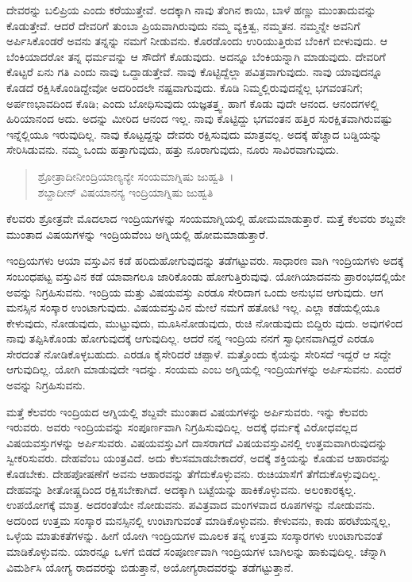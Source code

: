 ದೇವರನ್ನು ಬಲಿಪ್ರಿಯ ಎಂದು ಕರೆಯುತ್ತೇವೆ. ಅದಕ್ಕಾಗಿ ನಾವು ತೆಂಗಿನ ಕಾಯಿ, ಬಾಳೆ ಹಣ್ಣು ಮುಂತಾದುವನ್ನು ಕೊಡುತ್ತೇವೆ. ಆದರೆ ದೇವರಿಗೆ ತುಂಬಾ ಪ್ರಿಯವಾಗಿರುವುದು ನಮ್ಮ ವ್ಯಕ್ತಿತ್ವ, ನಮ್ಮತನ. ನಮ್ಮನ್ನೇ ಅವನಿಗೆ ಅರ್ಪಿಸಿಕೊಂಡರೆ ಅವನು ತನ್ನನ್ನು ನಮಗೆ ನೀಡುವನು. ಕೊರಡೊಂದು ಉರಿಯುತ್ತಿರುವ ಬೆಂಕಿಗೆ ಬೀಳುವುದು. ಆ ಬೆಂಕಿಯಾದರೋ ತನ್ನ ಧರ್ಮವನ್ನು ಆ ಸೌದೆಗೆ ಕೊಡುವುದು. ಅದನ್ನೂ ಬೆಂಕಿಯನ್ನಾಗಿ ಮಾಡುವುದು. ದೇವರಿಗೆ ಕೊಟ್ಟರೆ ಏನು ಗತಿ ಎಂದು ನಾವು ಒದ್ದಾಡುತ್ತೇವೆ. ನಾವು ಕೊಟ್ಟಿದ್ದೆಲ್ಲಾ ಪವಿತ್ರವಾಗುವುದು. ನಾವು ಯಾವುದನ್ನೂ ಕೊಡದೆ ರಕ್ಷಿಸಿಕೊಂಡಿದ್ದೇವೋ ಅದರಿಂದಲೇ ನಷ್ಟವಾಗುವುದು. ಕೊಡಿ ನಿಮ್ಮಲ್ಲಿರುವುದನ್ನೆಲ್ಲ ಭಗವಂತನಿಗೆ; ಅರ್ಪಣಭಾವದಿಂದ ಕೊಡಿ; ಎಂದು ಬೋಧಿಸುವುದು ಯಜ್ಞತತ್ತ್ವ. ಹಾಗೆ ಕೊಡು ವುದೇ ಆನಂದ. ಆನಂದಗಳಲ್ಲಿ ಹಿರಿಯಾನಂದ ಅದು. ಅದನ್ನು ಮೀರಿದ ಆನಂದ ಇಲ್ಲ. ನಾವು ಕೊಟ್ಟಿದ್ದು ಭಗವಂತನ ಹತ್ತಿರ ಸುರಕ್ಷಿತವಾಗಿರುವಷ್ಟು ಇನ್ನೆಲ್ಲಿಯೂ ಇರುವುದಿಲ್ಲ. ನಾವು ಕೊಟ್ಟದ್ದನ್ನು ದೇವರು ರಕ್ಷಿಸುವುದು ಮಾತ್ರವಲ್ಲ. ಅದಕ್ಕೆ ಹೆಚ್ಚಾದ ಬಡ್ಡಿಯನ್ನು ಸೇರಿಸಿಡುವನು. ನಮ್ಮ ಒಂದು ಹತ್ತಾಗುವುದು, ಹತ್ತು ನೂರಾಗುವುದು, ನೂರು ಸಾವಿರವಾಗುವುದು.

\begin{verse}
ಶ್ರೋತ್ರಾದೀನೀಂದ್ರಿಯಾಣ್ಯನ್ಯೇ ಸಂಯಮಾಗ್ನಿಷು ಜುಹ್ವತಿ~।\\ಶಬ್ದಾದೀನ್ ವಿಷಯಾನನ್ಯ ಇಂದ್ರಿಯಾಗ್ನಿಷು ಜುಹ್ವತಿ 
\end{verse}

{\small ಕೆಲವರು ಶ್ರೋತ್ರವೇ ಮೊದಲಾದ ಇಂದ್ರಿಯಗಳನ್ನು ಸಂಯಮಾಗ್ನಿಯಲ್ಲಿ ಹೋಮಮಾಡುತ್ತಾರೆ. ಮತ್ತೆ ಕೆಲವರು ಶಬ್ದವೇ ಮುಂತಾದ ವಿಷಯಗಳನ್ನು ಇಂದ್ರಿಯವೆಂಬ ಅಗ್ನಿಯಲ್ಲಿ ಹೋಮಮಾಡುತ್ತಾರೆ.}

ಇಂದ್ರಿಯಗಳು ಆಯಾ ವಸ್ತುವಿನ ಕಡೆ ಹರಿದುಹೋಗುವುದನ್ನು ತಡೆಗಟ್ಟುವರು. ಸಾಧಾರಣ ವಾಗಿ ಇಂದ್ರಿಯಗಳು ಅದಕ್ಕೆ ಸಂಬಂಧಪಟ್ಟ ವಸ್ತುವಿನ ಕಡೆ ಯಾವಾಗಲೂ ಜಾರಿಕೊಂಡು ಹೋಗುತ್ತಿರುವುವು. ಯೋಗಿಯಾದವನು ಪ್ರಾರಂಭದಲ್ಲಿಯೇ ಅವನ್ನು ನಿಗ್ರಹಿಸುವನು. ಇಂದ್ರಿಯ ಮತ್ತು ವಿಷಯವಸ್ತು ಎರಡೂ ಸೇರಿದಾಗ ಒಂದು ಅನುಭವ ಆಗುವುದು. ಆಗ ಮನಸ್ಸಿನ ಸಂಸ್ಕಾರ ಉಂಟಾಗುವುದು. ವಿಷಯವಸ್ತುವಿನ ಮೇಲೆ ನಮಗೆ ಹತೋಟಿ ಇಲ್ಲ. ಎಲ್ಲಾ ಕಡೆಯಲ್ಲಿಯೂ ಕೇಳುವುದು, ನೋಡುವುದು, ಮುಟ್ಟುವುದು, ಮೂಸಿನೋಡುವುದು, ರುಚಿ ನೋಡುವುದು ಬಿದ್ದಿರು ವುದು. ಅವುಗಳಿಂದ ನಾವು ತಪ್ಪಿಸಿಕೊಂಡು ಹೋಗುವುದಕ್ಕೆ ಆಗುವುದಿಲ್ಲ. ಆದರೆ ನನ್ನ ಇಂದ್ರಿಯ ನನಗೆ ಸ್ವಾಧೀನವಾಗಿದ್ದರೆ ಎರಡೂ ಸೇರದಂತೆ ನೋಡಿಕೊಳ್ಳಬಹುದು. ಎರಡೂ ಕೈಸೇರಿದರೆ ಚಪ್ಪಾಳೆ. ಮತ್ತೊಂದು ಕೈಯನ್ನು ಸೇರಿಸದೆ ಇದ್ದರೆ ಆ ಸದ್ದೇ ಆಗುವುದಿಲ್ಲ. ಯೋಗಿ ಮಾಡುವುದೇ ಇದನ್ನು. ಸಂಯಮ ಎಂಬ ಅಗ್ನಿಯಲ್ಲಿ ಇಂದ್ರಿಯಗಳನ್ನು ಅರ್ಪಿಸುವನು. ಎಂದರೆ ಅವನ್ನು ನಿಗ್ರಹಿಸುವನು.

ಮತ್ತೆ ಕೆಲವರು ಇಂದ್ರಿಯದ ಅಗ್ನಿಯಲ್ಲಿ ಶಬ್ದವೇ ಮುಂತಾದ ವಿಷಯಗಳನ್ನು ಅರ್ಪಿಸುವರು. ಇನ್ನು ಕೆಲವರು ಇರುವರು. ಅವರು ಇಂದ್ರಿಯವನ್ನು ಸಂಪೂರ್ಣವಾಗಿ ನಿಗ್ರಹಿಸುವುದಿಲ್ಲ. ಅದಕ್ಕೆ ಧರ್ಮಕ್ಕೆ ವಿರೋಧವಲ್ಲದ ವಿಷಯವಸ್ತುಗಳನ್ನು ಅರ್ಪಿಸುವರು. ವಿಷಯವಸ್ತುವಿಗೆ ದಾಸರಾಗದೆ ವಿಷಯವಸ್ತುವಿನಲ್ಲಿ ಉತ್ತಮವಾಗಿರುವುದನ್ನು ಸ್ವೀಕರಿಸುವರು. ದೇಹವೆಂಬ ಯಂತ್ರವಿದೆ. ಅದು ಕೆಲಸಮಾಡಬೇಕಾದರೆ, ಅದಕ್ಕೆ ಶಕ್ತಿಯನ್ನು ಕೊಡುವ ಆಹಾರವನ್ನು ಕೊಡಬೇಕು. ದೇಹಪೋಷಣೆಗೆ ಅವನು ಆಹಾರವನ್ನು ತೆಗೆದುಕೊಳ್ಳುವನು. ರುಚಿಯಾಸೆಗೆ ತೆಗೆದುಕೊಳ್ಳುವುದಿಲ್ಲ. ದೇಹವನ್ನು ಶೀತೋಷ್ಣದಿಂದ ರಕ್ಷಿಸಬೇಕಾಗಿದೆ. ಅದಕ್ಕಾಗಿ ಬಟ್ಟೆಯನ್ನು ಹಾಕಿಕೊಳ್ಳುವನು. ಅಲಂಕಾರಕ್ಕಲ್ಲ. ಉಪಯೋಗಕ್ಕೆ ಮಾತ್ರ. ಅದರಂತೆಯೇ ನೋಡುವನು. ಪವಿತ್ರವಾದ ಮಂಗಳವಾದ ರೂಪಗಳನ್ನು ನೋಡುವನು. ಅದರಿಂದ ಉತ್ತಮ ಸಂಸ್ಕಾರ ಮನಸ್ಸಿನಲ್ಲಿ ಉಂಟಾಗುವಂತೆ ಮಾಡಿಕೊಳ್ಳುವನು. ಕೇಳುವನು, ಕಾಡು ಹರಟೆಯನ್ನಲ್ಲ, ಒಳ್ಳೆಯ ಮಾತುಕತೆಗಳನ್ನು. ಹೀಗೆ ಯೋಗಿ ಇಂದ್ರಿಯಗಳ ಮೂಲಕ ತನ್ನ ಉತ್ತಮ ಸಂಸ್ಕಾರಗಳು ಉಂಟಾಗುವಂತೆ ಮಾಡಿಕೊಳ್ಳುವನು. ಯಾರನ್ನೂ ಒಳಗೆ ಬಿಡದೆ ಸಂಪೂರ್ಣವಾಗಿ ಇಂದ್ರಿಯಗಳ ಬಾಗಿಲನ್ನು ಹಾಕುವುದಿಲ್ಲ. ಚೆನ್ನಾಗಿ ವಿಮರ್ಶಿಸಿ ಯೋಗ್ಯ ರಾದವರನ್ನು ಬಿಡುತ್ತಾನೆ, ಅಯೋಗ್ಯರಾದವರನ್ನು ತಡೆಗಟ್ಟುತ್ತಾನೆ.

